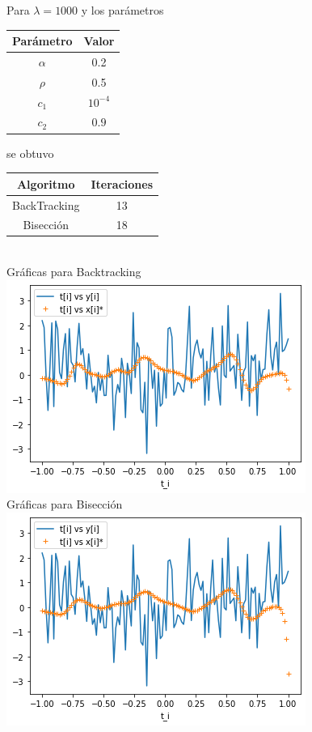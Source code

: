 \documentclass[11pt,letterpaper]{article}
\theoremstyle{definition}
\theoremstyle{definition}
\theoremstyle{definition}
\begin{document}
Para $ \lambda = 1000 $ y los parámetros
\begin{center}
	\begin{tabular}{cc}
		\hline
		Parámetro & Valor \\
		\hline
		$\alpha $ & 0.2 \\
		$ \rho $  & 0.5 \\
		$ c_1 $ & $ 10^{-4} $ \\
		$ c_2 $  & $ 0.9 $ \\
		\hline
	\end{tabular}
\end{center}
se obtuvo
\begin{center}
	\begin{tabular}{cc}
		\hline
		Algoritmo & Iteraciones \\
		\hline
		BackTracking & 13 \\
		Bisección    & 18 \\
		\hline
	\end{tabular}
	\\
	Gráficas para Backtracking
	\\
	\includegraphics[width=0.8\linewidth]{graficas/f3_backtracking_lambda1000}
	\\
	Gráficas para Bisección
	\\
	\includegraphics[width=0.8\linewidth]{graficas/f3_bisection_lambda1000}
\end{center}
\end{document}
